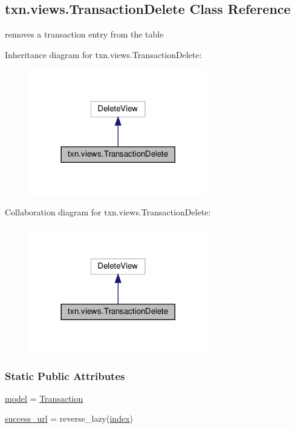 \hypertarget{classtxn_1_1views_1_1TransactionDelete}{}\subsection{txn.\+views.\+Transaction\+Delete Class Reference}
\label{classtxn_1_1views_1_1TransactionDelete}


removes a transaction entry from the table  




Inheritance diagram for txn.\+views.\+Transaction\+Delete\+:\nopagebreak
\begin{figure}[H]
\begin{center}
\leavevmode
\includegraphics[width=221pt]{classtxn_1_1views_1_1TransactionDelete__inherit__graph}
\end{center}
\end{figure}


Collaboration diagram for txn.\+views.\+Transaction\+Delete\+:\nopagebreak
\begin{figure}[H]
\begin{center}
\leavevmode
\includegraphics[width=221pt]{classtxn_1_1views_1_1TransactionDelete__coll__graph}
\end{center}
\end{figure}
\subsubsection*{Static Public Attributes}
\begin{DoxyCompactItemize}
\item 
\hyperlink{classtxn_1_1views_1_1TransactionDelete_a237c03b6720901284adfe618d0e34124}{model} = \hyperlink{classtxn_1_1models_1_1Transaction}{Transaction}
\item 
\hyperlink{classtxn_1_1views_1_1TransactionDelete_abfde2acba072b8d8900971a288187634}{success\+\_\+url} = reverse\+\_\+lazy(\textquotesingle{}\hyperlink{namespacetxn_1_1views_a61ce77e1acb7dff6d535eb5df692cc15}{index}\textquotesingle{})
\end{DoxyCompactItemize}


